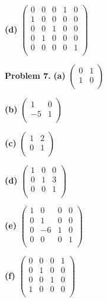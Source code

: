 \documentclass[oneside,12pt]{amsart}
\begin{document}
\bigskip

\textbf{(d)}
$
\begin{pmatrix}
0 & 0 & 0 & 1 & 0\\
1 & 0 & 0 & 0 & 0\\
0 & 0 & 1 & 0 & 0\\
0 & 1 & 0 & 0 & 0\\
0 & 0 & 0 & 0 & 1\\
\end{pmatrix}
$

\bigskip

\textbf{Problem 7.}
\textbf{(a)}
$
\begin{pmatrix}
0 & 1 \\
1 & 0 \\
\end{pmatrix}
$

\bigskip

\textbf{(b)}
$
\begin{pmatrix}
1 & 0 \\
-5 & 1 \\
\end{pmatrix}
$

\bigskip

\textbf{(c)}
$
\begin{pmatrix}
1 & 2 \\
0 & 1 \\
\end{pmatrix}
$

\bigskip

\textbf{(d)}
$
\begin{pmatrix}
1 & 0  & 0 \\
0 & 1  & 3 \\
0 & 0  & 1\\
\end{pmatrix}
$

\bigskip

\textbf{(e)}
$
\begin{pmatrix}
1 & 0  & 0 & 0\\
0 & 1  & 0 & 0\\
0 & -6  & 1 & 0\\
0 & 0  & 0 & 1\\
\end{pmatrix}
$

\bigskip

\textbf{(f)}
$
\begin{pmatrix}
0 & 0  & 0 & 1\\
0 & 1  & 0 & 0\\
0 & 0  & 1 & 0\\
1 & 0  & 0 & 0\\
\end{pmatrix}
$
\end{document}
